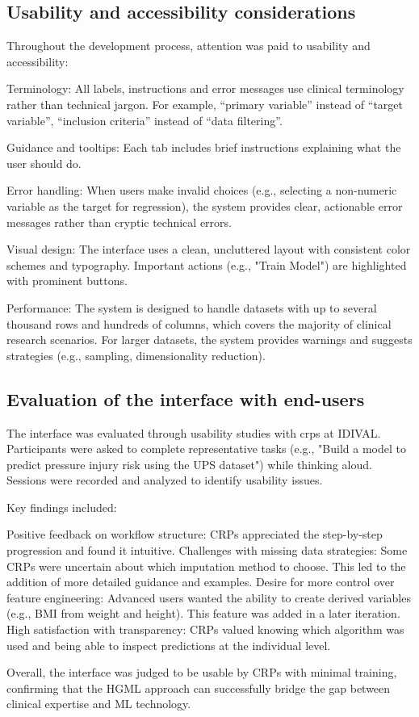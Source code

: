 \subsection{Usability and accessibility considerations}

Throughout the development process, attention was paid to usability and accessibility:

Terminology: All labels, instructions and error messages use clinical terminology rather than technical jargon. For example, ``primary variable'' instead of ``target variable'', ``inclusion criteria'' instead of ``data filtering''.

Guidance and tooltips: Each tab includes brief instructions explaining what the user should do.

Error handling: When users make invalid choices (e.g., selecting a non-numeric variable as the target for regression), the system provides clear, actionable error messages rather than cryptic technical errors.

Visual design: The interface uses a clean, uncluttered layout with consistent color schemes and typography. Important actions (e.g., "Train Model") are highlighted with prominent buttons.

Performance: The system is designed to handle datasets with up to several thousand rows and hundreds of columns, which covers the majority of clinical research scenarios. For larger datasets, the system provides warnings and suggests strategies (e.g., sampling, dimensionality reduction).

\subsection{Evaluation of the interface with end-users}

The interface was evaluated through usability studies with \glspl{crp} at IDIVAL. Participants were asked to complete representative tasks (e.g., "Build a model to predict pressure injury risk using the UPS dataset") while thinking aloud. Sessions were recorded and analyzed to identify usability issues.

Key findings included:

    Positive feedback on workflow structure: CRPs appreciated the step-by-step progression and found it intuitive.
    Challenges with missing data strategies: Some CRPs were uncertain about which imputation method to choose. This led to the addition of more detailed guidance and examples.
    Desire for more control over feature engineering: Advanced users wanted the ability to create derived variables (e.g., BMI from weight and height). This feature was added in a later iteration.
    High satisfaction with transparency: CRPs valued knowing which algorithm was used and being able to inspect predictions at the individual level.

Overall, the interface was judged to be usable by CRPs with minimal training, confirming that the HGML approach can successfully bridge the gap between clinical expertise and ML technology.